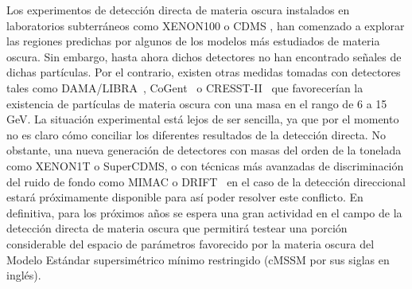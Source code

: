 Los experimentos de detección directa de materia oscura instalados en
laboratorios subterráneos como XENON100 \cite{Aprile:2011ts}
o CDMS \cite{Ahmed:2009zw,Ahmed:2010wy}, han
comenzado a explorar las regiones predichas por algunos de los modelos
más estudiados de materia oscura.
Sin embargo, hasta ahora dichos detectores no han encontrado señales
de dichas partículas. Por el contrario, existen otras medidas tomadas
con detectores tales como DAMA/LIBRA~\cite{Bernabei:2010mq},
CoGent~\cite{Aalseth:2011wp} o CRESST-II~\cite{Angloher:2011uu} que
favorecerían la existencia de partículas de materia oscura con una masa
en el rango de 6 a 15 GeV.
La situación experimental está lejos de ser sencilla, ya que por el momento
no es claro cómo conciliar los diferentes resultados de la detección directa.
No obstante, una nueva generación de detectores con masas del orden de la
tonelada como XENON1T o SuperCDMS, o con técnicas más avanzadas de
discriminación del ruido de fondo como MIMAC \cite{Billard:2011yf}
o DRIFT~\cite{Pipe:2010zz} en el caso de la detección direccional estará
próximamente disponible para así poder resolver este conflicto.
En definitiva, para los próximos años se espera una gran actividad en
el campo de la detección directa de materia oscura que permitirá
testear una porción considerable del espacio de parámetros favorecido por
la materia oscura del Modelo Estándar supersimétrico mínimo restringido
(cMSSM por sus siglas en inglés).\\ 

